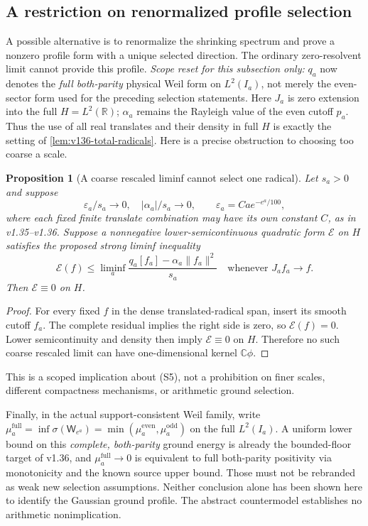 \documentclass[11pt]{article}
\newtheorem{proposition}[theorem]{Proposition}
\theoremstyle{remark}
\begin{document}
\subsection*{A restriction on renormalized profile selection}

A possible alternative is to renormalize the shrinking spectrum and
prove a nonzero profile form with a unique selected direction.
The ordinary zero-resolvent limit cannot provide this profile.
\emph{Scope reset for this subsection only:} $q_a$ now denotes the
\emph{full both-parity} physical Weil form on $L^2(I_a)$, not merely
the even-sector form used for the preceding selection statements.
Here $J_a$ is zero extension into the full $H=L^2(\mathbb R)$;
$\alpha_a$ remains the Rayleigh value of the even cutoff $p_a$.
Thus the use of all real translates and their density in full $H$
is exactly the setting of \ref{lem:v136-total-radicals}.
Here is a precise obstruction to choosing too coarse a scale.
\begin{proposition}[A coarse rescaled liminf cannot select one radical]
\label{prop:ns43-ccm-coarse-profile}
Let $s_a>0$ and suppose
\[
 \varepsilon_a/s_a\to0,\quad |\alpha_a|/s_a\to0,
 \qquad \varepsilon_a=Ca e^{-e^a/100},
\]
where each fixed finite translate combination may have its own constant
$C$, as in v1.35--v1.36. Suppose a nonnegative lower-semicontinuous
quadratic form $\mathcal E$ on $H$ satisfies the proposed strong
liminf inequality
\[
 \mathcal E(f)\le\liminf_a
 \frac{q_a[f_a]-\alpha_a\|f_a\|^2}{s_a}
 \quad\text{whenever }J_af_a\to f.
 \tag{S5}
\]
Then $\mathcal E\equiv0$ on $H$.
\end{proposition}
\begin{proof}
For every fixed $f$ in the dense translated-radical span, insert its
smooth cutoff $f_a$. The complete residual implies the right side is
zero, so $\mathcal E(f)=0$. Lower semicontinuity and density then imply
$\mathcal E\equiv0$ on $H$. Therefore no such coarse rescaled limit
can have one-dimensional kernel $\mathbb C\phi$.
\end{proof}
This is a scoped implication about (S5), not a prohibition on finer
scales, different compactness mechanisms, or arithmetic ground selection.

Finally, in the actual support-consistent Weil family, write
$\mu_a^{\mathrm{full}}=\inf\sigma(\mathsf W_{e^a})
=\min(\mu_a^{\mathrm{even}},\mu_a^{\mathrm{odd}})$ on the full
$L^2(I_a)$. A uniform lower bound on this \emph{complete, both-parity}
ground energy is already the bounded-floor
target of v1.36, and $\mu_a^{\mathrm{full}}\to0$ is equivalent to
full both-parity positivity
via monotonicity and the known source upper bound. Those must not be
rebranded as weak new selection assumptions. Neither conclusion alone
has been shown here to identify the Gaussian ground profile. The
abstract countermodel establishes no arithmetic nonimplication.
\end{document}
